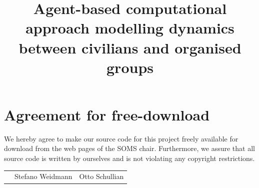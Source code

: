 \documentclass[11pt]{article}
\title{Agent-based computational approach modelling dynamics between civilians and organised groups}
\begin{document}

\newpage


\newpage
\section*{Agreement for free-download}
\bigskip


\bigskip


\large We hereby agree to make our source code for this project freely available for download from the web pages of the SOMS chair. Furthermore, we assure that all source code is written by ourselves and is not violating any copyright restrictions.

\begin{center}

\bigskip


\bigskip


\begin{tabular}{@{}p{3.3cm}@{}p{6cm}@{}@{}p{6cm}@{}}
\begin{minipage}{3cm}

\end{minipage}
&
\begin{minipage}{6cm}
\vspace{2mm} \large Stefano Weidmann

 \vspace{\baselineskip}

\end{minipage}
&
\begin{minipage}{6cm}

\large Otto Schullian

\end{minipage}
\end{tabular}


\end{center}
\newpage







\tableofcontents

\newpage

\end{document}
